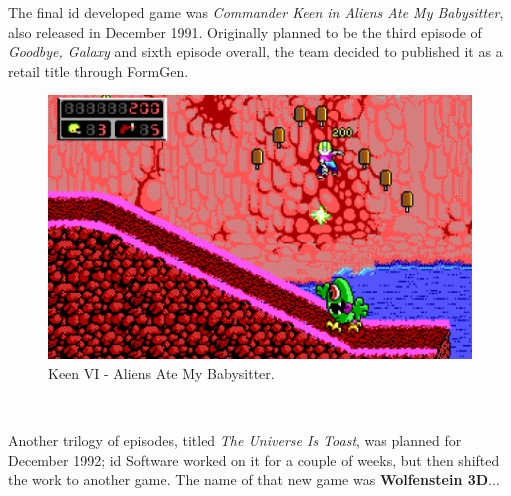 \documentclass[book.tex]{subfiles}
\begin{document}
\par
The final id developed game was \textit{Commander Keen in Aliens Ate My Babysitter}, also released in December 1991. Originally planned to be the third episode of \textit{Goodbye, Galaxy} and sixth episode overall, the team decided to published it as a retail title through FormGen.\\

\begin{figure}[H]
  \centering
  \includegraphics[width=.95\textwidth]{screenshots_300dpi/keen3_1.png}
  \caption{Keen VI - Aliens Ate My Babysitter.}
\label{fig:keen_1}
\end{figure}


\\

\par
Another trilogy of episodes, titled \textit{The Universe Is Toast}, was planned for December 1992; id Software worked on it for a couple of weeks, but then shifted the work to another game. The name of that new game was \textbf{Wolfenstein 3D}...
\end{document}

